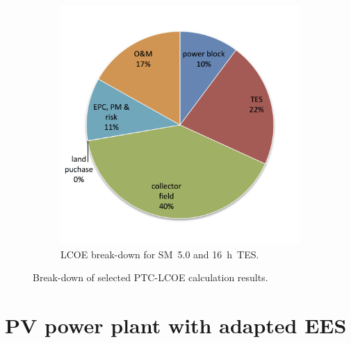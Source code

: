 \begin{figure}[!htbp]
\begin{subfigure}[b]{0.5\textwidth}
                \includegraphics[width=1\textwidth]{FIG/PTC_LCOE_highinvest_BreakDown}
                \caption{LCOE break-down for SM~5.0 and \SI{16}{h}~TES.}\label{PTC_LCOE_highinvest_BreakDown}
        \end{subfigure}
        \caption[Break-down of selected PTC-LCOE calculation results.]{Break-down of selected PTC-LCOE calculation results.}\label{PTC_LCOE_BreakDown}
\end{figure}
\pagebreak
\section{PV power plant with adapted EES}

